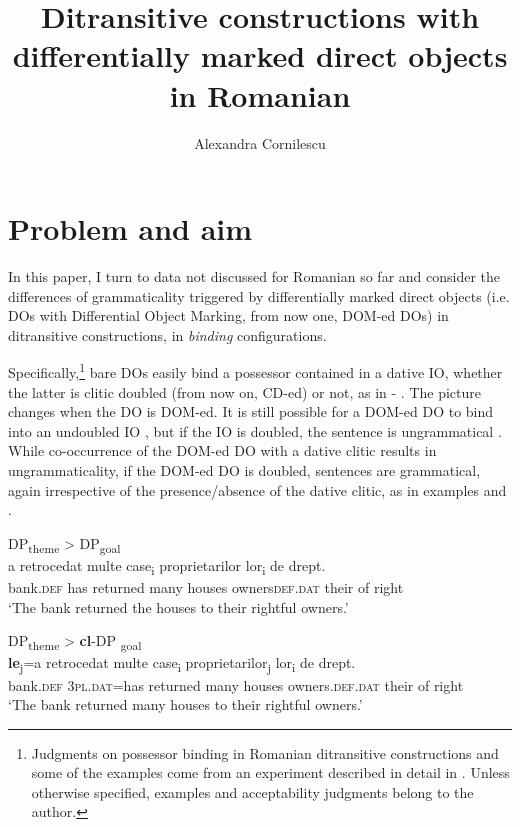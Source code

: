 \documentclass[output=paper,colorlinks,citecolor=brown,nonflat]{langsci/langscibook}
\author{Alexandra Cornilescu\affiliation{University of Bucharest}}
\title{Ditransitive constructions with differentially marked direct objects in Romanian}
\begin{document}
\maketitle


\section{Problem and aim} %

In this paper, I turn to data not discussed for Romanian so far and consider the differences of grammaticality triggered by differentially marked direct objects (i.e. DOs with Differential Object Marking, from now one, DOM-ed DOs) in ditransitive constructions, in \textit{binding} configurations.

Specifically,\footnote{Judgments on possessor binding in Romanian ditransitive constructions and some of the examples come from an experiment described in detail in \citet{CornilescuDinuTigău2017Dative}. Unless otherwise specified, examples and acceptability judgments belong to the author.} bare DOs easily bind a possessor contained in a dative IO, whether the latter is clitic doubled (from now on, CD-ed) or not, as in  - . The picture changes when the DO is DOM-ed. It is still possible for a DOM-ed DO to bind into an undoubled IO , but if the IO is doubled, the sentence is ungrammatical . While co-occurrence of the DOM-ed DO with a dative clitic results in ungrammaticality, if the DOM-ed \textsc{DO} is doubled, sentences are grammatical, again irrespective of the presence/absence of the dative clitic, as in examples  and .

\ea \label{ex:cornilescu:1} DP\textsubscript{theme} > DP\textsubscript{goal}\\ %
          {a} {retrocedat}  {multe} {case\textsubscript{i}}  {proprietarilor}   {lor\textsubscript{i}}  {de} {drept}.\\
bank.\textsc{def} has returned  many houses  owners\textsc{def}.\textsc{dat} their of right\\
        \glt ‘The bank returned the houses to their rightful owners.’ \citep[162]{CornilescuDinuTigău2017DOC}
\z


\ea %
    \label{ex:cornilescu:2}
    DP\textsubscript{theme} > \textbf{cl}-DP \textsubscript{goal}\\
     \textbf{{le}}{\textsubscript{j}}{=a} {retrocedat} {multe} {case\textsubscript{i}} {proprietarilor\textsubscript{j}} {lor\textsubscript{i}} {de} {drept}.\\
        bank.\textsc{def} \textsc{3pl.dat}=has returned many houses owners.\textsc{def}.\textsc{dat} their of right\\
    \glt ‘The bank returned many houses to their rightful owners.’ \citep[162]{CornilescuDinuTigău2017DOC}
    \z
\end{document}
